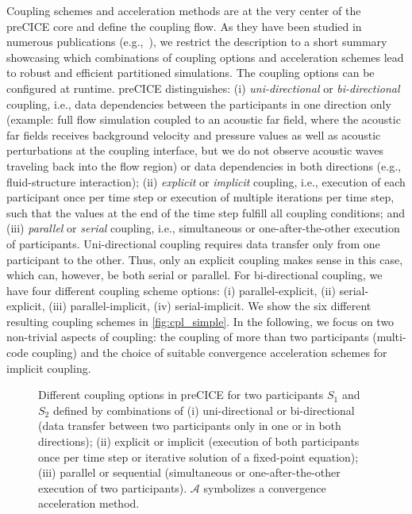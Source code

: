 Coupling schemes and acceleration methods are at the very center of the preCICE core and define the coupling flow. As they have been studied in numerous publications (e.g.,~\cite{Mehl2016, Lindner2015_MVQN, Scheuf:QN}), we restrict the description to 
a short summary showcasing which combinations of coupling options and acceleration
schemes lead to robust and efficient partitioned simulations.
%
The coupling options can be configured at runtime. preCICE distinguishes: (i) \textit{uni-directional} or \textit{bi-directional} coupling, i.e., data dependencies between the participants in one direction only (example: full flow simulation coupled to an acoustic far field, where the acoustic far fields receives background velocity and pressure values as well as acoustic perturbations at the coupling interface, but we do not observe acoustic waves traveling back into the flow region) or data dependencies in both directions (e.g., fluid-structure interaction); (ii) \textit{explicit} or \textit{implicit} coupling, i.e., execution of each participant once per time step or execution of multiple iterations per time step, such that the values at the end of the time step fulfill all coupling conditions; and (iii) \textit{parallel} or \textit{serial} coupling, i.e., simultaneous
or one-after-the-other execution of participants.
%
 Uni-directional coupling requires data transfer only from one participant to the other. Thus, only an explicit coupling makes sense in this case, which can, however, be both serial or parallel. For bi-directional coupling, we have four different coupling scheme options: (i) parallel-explicit, (ii) serial-explicit, (iii) parallel-implicit, (iv) serial-implicit. We show the six different resulting coupling schemes in
 \autoref{fig:cpl_simple}.
In the following, we focus on two non-trivial aspects of coupling: the coupling of more than two participants (multi-code coupling) and the choice of suitable convergence acceleration schemes for implicit coupling.

\begin{figure}[h!]
\centering

\caption{
\label{fig:cpl_simple}
Different coupling options in preCICE for two participants $S_1$ and $S_2$ defined by combinations of (i) uni-directional or bi-directional (data transfer between two participants only in one or in both directions); (ii) explicit or implicit (execution of both participants once per time step or iterative solution of a fixed-point equation); (iii) parallel or sequential (simultaneous or one-after-the-other execution of two participants). $\mathcal{A}$ symbolizes a convergence acceleration method.}
\end{figure}


